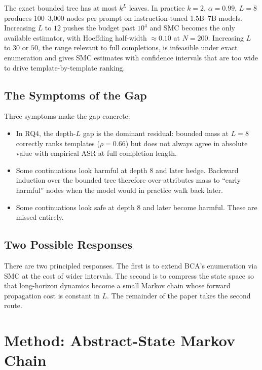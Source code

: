 \documentclass[11pt]{article}
\newcommand{\BCA}{\textsc{BCA}}
\newcommand{\ASR}{\textsc{ASR}}
\newcommand{\SMC}{\textsc{SMC}}
\begin{document}
The exact bounded tree has at most $k^L$ leaves.  In practice $k = 2$, $\alpha = 0.99$, $L = 8$ produces 100--3{,}000 nodes per prompt on instruction-tuned 1.5B--7B models.  Increasing $L$ to $12$ pushes the budget past $10^4$ and \SMC{} becomes the only available estimator, with Hoeffding half-width $\approx 0.10$ at $N=200$.  Increasing $L$ to $30$ or $50$, the range relevant to full completions, is infeasible under exact enumeration and gives \SMC{} estimates with confidence intervals that are too wide to drive template-by-template ranking.

\subsection{The Symptoms of the Gap}

Three symptoms make the gap concrete:

\begin{itemize}[leftmargin=*,itemsep=2pt]
  \item In RQ4, the depth-$L$ gap is the dominant residual: bounded mass at $L=8$ correctly ranks templates ($\rho = 0.66$) but does not always agree in absolute value with empirical \ASR{} at full completion length.
  \item Some continuations look harmful at depth $8$ and later hedge.  Backward induction over the bounded tree therefore over-attributes mass to ``early harmful'' nodes when the model would in practice walk back later.
  \item Some continuations look safe at depth $8$ and later become harmful.  These are missed entirely.
\end{itemize}

\subsection{Two Possible Responses}

There are two principled responses.  The first is to extend \BCA{}'s enumeration via \SMC{} at the cost of wider intervals.  The second is to compress the state space so that long-horizon dynamics become a small Markov chain whose forward propagation cost is constant in $L$.  The remainder of the paper takes the second route.

\section{Method: Abstract-State Markov Chain}
\label{sec:method-abstract}
\end{document}
